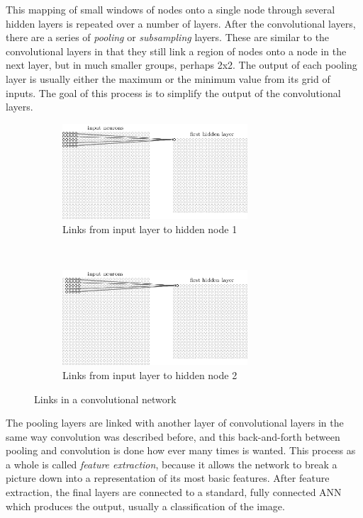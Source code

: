This mapping of small windows of nodes onto a single node through several hidden layers is repeated over a number of layers.  After the convolutional layers, there are a series of \textit{pooling} or \textit{subsampling} layers.  These are similar to the convolutional layers in that they still link a region of nodes onto a node in the next layer, but in much smaller groups, perhaps 2x2.  The output of each pooling layer is usually either the maximum or the minimum value from its grid of inputs.  The goal of this process is to simplify the output of the convolutional layers.

\begin{figure}[h!]
    \centering
    \begin{subfigure}[t]{0.5\textwidth}
        \centering
        \includegraphics[height=1.4in]{images/dcnmain1.png}
        \caption{Links from input layer to hidden node 1}
    \end{subfigure}%
    ~ 
    \begin{subfigure}[t]{0.5\textwidth}
        \centering
        \includegraphics[height=1.4in]{images/dcnmain2.png}
        \caption{Links from input layer to hidden node 2}
    \end{subfigure}
    \caption{Links in a convolutional network\cite{handwriting}}
    \label{ref:dcnmain}
\end{figure}

The pooling layers are linked with another layer of convolutional layers in the same way convolution was described before, and this back-and-forth between pooling and convolution is done how ever many times is wanted.  This process as a whole is called \textit{feature extraction}, because it allows the network to break a picture down into a representation of its most basic features.  After feature extraction, the final layers are connected to a standard, fully connected ANN which produces the output, usually a classification of the image.

